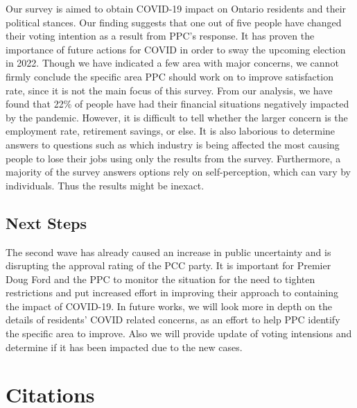 \documentclass[
]{article}
\begin{document}
Our survey is aimed to obtain COVID-19 impact on Ontario residents and
their political stances. Our finding suggests that one out of five
people have changed their voting intention as a result from PPC's
response. It has proven the importance of future actions for COVID in
order to sway the upcoming election in 2022. Though we have indicated a
few area with major concerns, we cannot firmly conclude the specific
area PPC should work on to improve satisfaction rate, since it is not
the main focus of this survey. From our analysis, we have found that
22\% of people have had their financial situations negatively impacted
by the pandemic. However, it is difficult to tell whether the larger
concern is the employment rate, retirement savings, or else. It is also
laborious to determine answers to questions such as which industry is
being affected the most causing people to lose their jobs using only the
results from the survey. Furthermore, a majority of the survey answers
options rely on self-perception, which can vary by individuals. Thus the
results might be inexact.

\hypertarget{next-steps}{%
\subsection{Next Steps}\label{next-steps}}

The second wave has already caused an increase in public uncertainty and
is disrupting the approval rating of the PCC party. It is important for
Premier Doug Ford and the PPC to monitor the situation for the need to
tighten restrictions and put increased effort in improving their
approach to containing the impact of COVID-19. In future works, we will
look more in depth on the details of residents' COVID related concerns,
as an effort to help PPC identify the specific area to improve. Also we
will provide update of voting intensions and determine if it has been
impacted due to the new cases.

\newpage

\hypertarget{citations}{%
\section{Citations}\label{citations}}
\end{document}
